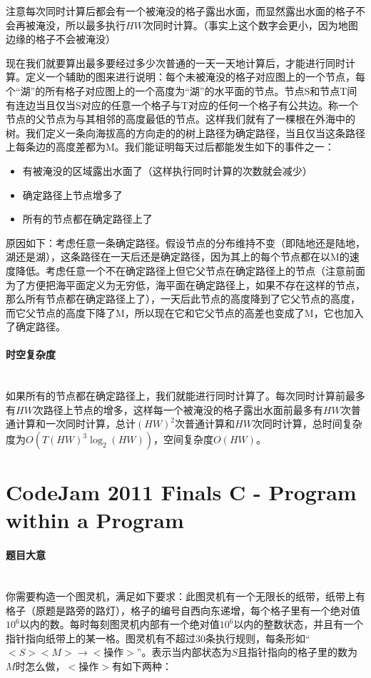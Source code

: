 \documentclass[UTF8]{ctexart}
\newcommand{\myparagraph}[1]{\paragraph{#1}\mbox{}\\}
\theoremstyle{nonumberplain}
\begin{document}
			注意每次同时计算后都会有一个被淹没的格子露出水面，而显然露出水面的格子不会再被淹没，所以最多执行$HW$次同时计算。（事实上这个数字会更小，因为地图边缘的格子不会被淹没）
		
			现在我们就要算出最多要经过多少次普通的一天一天地计算后，才能进行同时计算。定义一个辅助的图来进行说明：每个未被淹没的格子对应图上的一个节点，每个“湖”的所有格子对应图上的一个高度为“湖”的水平面的节点。节点S和节点T间有连边当且仅当S对应的任意一个格子与T对应的任何一个格子有公共边。称一个节点的父节点为与其相邻的高度最低的节点。这样我们就有了一棵根在外海中的树。我们定义一条向海拔高的方向走的的树上路径为确定路径，当且仅当这条路径上每条边的高度差都为M。我们能证明每天过后都能发生如下的事件之一：
		
			\begin{itemize}[leftmargin=15mm]
				\item 有被淹没的区域露出水面了（这样执行同时计算的次数就会减少）
				\item 确定路径上节点增多了
				\item 所有的节点都在确定路径上了
			\end{itemize}
		
			原因如下：考虑任意一条确定路径。假设节点的分布维持不变（即陆地还是陆地，湖还是湖），这条路径在一天后还是确定路径，因为其上的每个节点都在以M的速度降低。考虑任意一个不在确定路径上但它父节点在确定路径上的节点（注意前面为了方便把海平面定义为无穷低，海平面在确定路径上，如果不存在这样的节点，那么所有节点都在确定路径上了），一天后此节点的高度降到了它父节点的高度，而它父节点的高度下降了M，所以现在它和它父节点的高差也变成了M，它也加入了确定路径。
		
		\myparagraph{时空复杂度}
		
			如果所有的节点都在确定路径上，我们就能进行同时计算了。每次同时计算前最多有$HW$次路径上节点的增多，这样每一个被淹没的格子露出水面前最多有$HW$次普通计算和一次同时计算，总计$(HW)^2$次普通计算和$HW$次同时计算，总时间复杂度为$O(T(HW)^3 \log_2(HW))$，空间复杂度$O(HW)$。
	
	\section{CodeJam 2011 Finals C - Program within a Program}
	
		\myparagraph{题目大意}
		
			你需要构造一个图灵机，满足如下要求：此图灵机有一个无限长的纸带，纸带上有格子（原题是路旁的路灯），格子的编号自西向东递增，每个格子里有一个绝对值$10^6$以内的数。每时每刻图灵机内部有一个绝对值$10^6$以内的整数状态，并且有一个指针指向纸带上的某一格。图灵机有不超过$30$条执行规则，每条形如“$<S> <M> \to <\mbox{操作}>$”。表示当内部状态为$S$且指针指向的格子里的数为$M$时怎么做，$<$操作$>$有如下两种：
			
\end{document}
